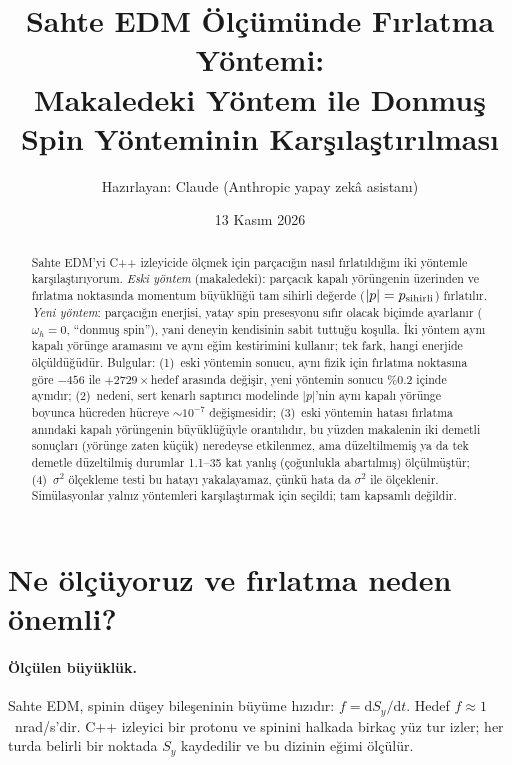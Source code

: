 \documentclass[11pt,a4paper]{article}
\title{Sahte EDM Ölçümünde Fırlatma Yöntemi:\\ Makaledeki Yöntem ile Donmuş Spin Yönteminin Karşılaştırılması}
\author{Hazırlayan: Claude (Anthropic yapay zekâ asistanı)}
\date{13 Kasım 2026}
\begin{document}
\sloppy
\maketitle

\begin{abstract}
\noindent Sahte EDM'yi C++ izleyicide ölçmek için parçacığın nasıl fırlatıldığını iki yöntemle
karşılaştırıyorum. \emph{Eski yöntem} (makaledeki): parçacık kapalı yörüngenin üzerinden ve fırlatma
noktasında momentum büyüklüğü tam sihirli değerde ($|p|=p_{\rm sihirli}$) fırlatılır. \emph{Yeni yöntem}:
parçacığın enerjisi, yatay spin presesyonu sıfır olacak biçimde ayarlanır ($\omega_h=0$, ``donmuş spin''),
yani deneyin kendisinin sabit tuttuğu koşulla. İki yöntem aynı kapalı yörünge aramasını ve aynı eğim
kestirimini kullanır; tek fark, hangi enerjide ölçüldüğüdür. Bulgular: (1)~eski yöntemin sonucu, aynı
fizik için fırlatma noktasına göre $-456$ ile $+2729\times$hedef arasında değişir, yeni yöntemin sonucu
\%0.2 içinde aynıdır; (2)~nedeni, sert kenarlı saptırıcı modelinde $|p|$'nin aynı kapalı yörünge
boyunca hücreden hücreye $\sim10^{-7}$ değişmesidir; (3)~eski yöntemin hatası fırlatma anındaki kapalı
yörüngenin büyüklüğüyle orantılıdır, bu yüzden makalenin iki demetli sonuçları (yörünge zaten küçük)
neredeyse etkilenmez, ama düzeltilmemiş ya da tek demetle düzeltilmiş durumlar 1.1--35 kat yanlış
(çoğunlukla abartılmış) ölçülmüştür; (4)~$\sigma^2$ ölçekleme testi bu hatayı yakalayamaz, çünkü hata da $\sigma^2$ ile ölçeklenir.
Simülasyonlar yalnız yöntemleri karşılaştırmak için seçildi; tam kapsamlı değildir.
\end{abstract}

\tableofcontents
\newpage

\section{Ne ölçüyoruz ve fırlatma neden önemli?}

\paragraph{Ölçülen büyüklük.} Sahte EDM, spinin düşey bileşeninin büyüme hızıdır: $f=\mathrm{d}S_y/\mathrm{d}t$.
Hedef $f\approx1$~nrad/s'dir. C++ izleyici bir protonu ve spinini halkada birkaç yüz tur izler; her turda
belirli bir noktada $S_y$ kaydedilir ve bu dizinin eğimi ölçülür.
\end{document}
